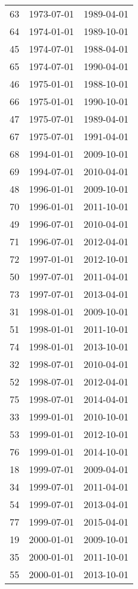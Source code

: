% 
\begin{tabular}{ccc}
  \hline
  \hline
63 & 1973-07-01 & 1989-04-01 \\ 
  64 & 1974-01-01 & 1989-10-01 \\ 
  45 & 1974-07-01 & 1988-04-01 \\ 
  65 & 1974-07-01 & 1990-04-01 \\ 
  46 & 1975-01-01 & 1988-10-01 \\ 
  66 & 1975-01-01 & 1990-10-01 \\ 
  47 & 1975-07-01 & 1989-04-01 \\ 
  67 & 1975-07-01 & 1991-04-01 \\ 
  68 & 1994-01-01 & 2009-10-01 \\ 
  69 & 1994-07-01 & 2010-04-01 \\ 
  48 & 1996-01-01 & 2009-10-01 \\ 
  70 & 1996-01-01 & 2011-10-01 \\ 
  49 & 1996-07-01 & 2010-04-01 \\ 
  71 & 1996-07-01 & 2012-04-01 \\ 
  72 & 1997-01-01 & 2012-10-01 \\ 
  50 & 1997-07-01 & 2011-04-01 \\ 
  73 & 1997-07-01 & 2013-04-01 \\ 
  31 & 1998-01-01 & 2009-10-01 \\ 
  51 & 1998-01-01 & 2011-10-01 \\ 
  74 & 1998-01-01 & 2013-10-01 \\ 
  32 & 1998-07-01 & 2010-04-01 \\ 
  52 & 1998-07-01 & 2012-04-01 \\ 
  75 & 1998-07-01 & 2014-04-01 \\ 
  33 & 1999-01-01 & 2010-10-01 \\ 
  53 & 1999-01-01 & 2012-10-01 \\ 
  76 & 1999-01-01 & 2014-10-01 \\ 
  18 & 1999-07-01 & 2009-04-01 \\ 
  34 & 1999-07-01 & 2011-04-01 \\ 
  54 & 1999-07-01 & 2013-04-01 \\ 
  77 & 1999-07-01 & 2015-04-01 \\ 
  19 & 2000-01-01 & 2009-10-01 \\ 
  35 & 2000-01-01 & 2011-10-01 \\ 
  55 & 2000-01-01 & 2013-10-01 \\ 

\end{tabular}
